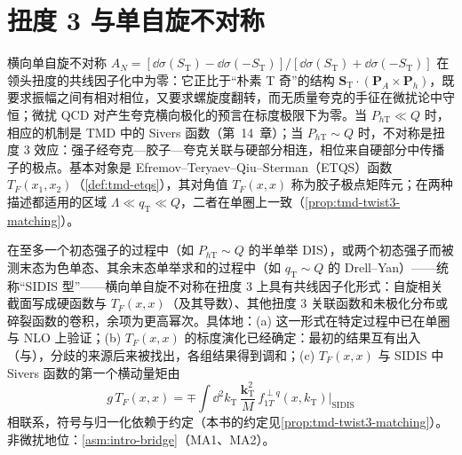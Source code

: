 \section{扭度 3 与单自旋不对称}\label{sec:power-twist3}

横向单自旋不对称 $A_N=[\dd\sigma(S_{\mathrm T})-\dd\sigma(-S_{\mathrm T})]/[\dd\sigma(S_{\mathrm T})+\dd\sigma(-S_{\mathrm T})]$ 在领头扭度的共线因子化中为零：它正比于“朴素 T 奇”的结构 $\mathbf S_{\mathrm T}\cdot(\mathbf P_A\times\mathbf P_h)$，既要求振幅之间有相对相位，又要求螺旋度翻转，而无质量夸克的手征在微扰论中守恒；微扰 QCD 对产生夸克横向极化的预言在标度极限下为零\cite{Kane:1978nd}。当 $P_{h\mathrm T}\ll Q$ 时，相应的机制是 TMD 中的 Sivers 函数（第~14~章）；当 $P_{h\mathrm T}\sim Q$ 时，不对称是扭度 3 效应：强子经夸克—胶子—夸克关联与硬部分相连，相位来自硬部分中传播子的极点。基本对象是 Efremov--Teryaev--Qiu--Sterman（ETQS）函数 $T_F(x_1,x_2)$（\cref{def:tmd-etqs}）\cite{Efremov:1981sh,EfremovTeryaev1985,QiuSterman1991c}，其对角值 $T_F(x,x)$ 称为胶子极点矩阵元；在两种描述都适用的区域 $\Lambda\ll q_{\mathrm T}\ll Q$，二者在单圈上一致\cite{Ji:2006ub}（\cref{prop:tmd-twist3-matching}）。

\begin{proposition}\label{prop:power-twist3-sidis}
在至多一个初态强子的过程中（如 $P_{h\mathrm T}\sim Q$ 的半单举 DIS），或两个初态强子而被测末态为色单态、其余末态单举求和的过程中（如 $q_{\mathrm T}\sim Q$ 的 Drell--Yan）——统称“SIDIS 型”——横向单自旋不对称在扭度 3 上具有共线因子化形式：自旋相关截面写成硬函数与 $T_F(x,x)$（及其导数）、其他扭度 3 关联函数和未极化分布或碎裂函数的卷积，余项为更高幂次。具体地：(a) 这一形式在特定过程中已在单圈与 NLO 上验证\cite{Ji:2006ub,Vogelsang:2009pj}；(b) $T_F(x,x)$ 的标度演化已经确定：最初的结果互有出入（\cite{Braun:2009mi}与\cite{Kang:2008ey}），分歧的来源后来被找出，各组结果得到调和\cite{Kang:2012em,Schafer:2012ra}；(c) $T_F(x,x)$ 与 SIDIS 中 Sivers 函数的第一个横动量矩由
\begin{equation}\label{eq:power-TF-sivers}
g\,T_F(x,x)=\mp\int\!\dd^2k_{\mathrm T}\,\frac{\mathbf k_{\mathrm T}^2}{M}\,f^{\perp q}_{1T}(x,k_{\mathrm T})\Big|_{\mathrm{SIDIS}}
\end{equation}
相联系，符号与归一化依赖于约定\cite{Boer:2003cm}（本书的约定见\cref{prop:tmd-twist3-matching}）。
非微扰地位：\cref{asm:intro-bridge}（MA1、MA2）。
\end{proposition}

